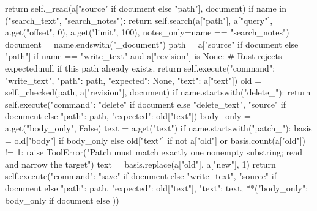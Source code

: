             return self._read(a["source" if document else "path"], document)
        if name in ("search_text", "search_notes"):
            return self.search(a["path"], a["query"], a.get("offset", 0), a.get("limit", 100), notes_only=name == "search_notes")
        document = name.endswith("_document")
        path = a["source" if document else "path"]
        if name == "write_text" and a["revision"] is None:
            # Rust rejects expected:null if this path already exists.
            return self.execute({"command": "write_text", "path": path, "expected": None, "text": a["text"]})
        old = self._checked(path, a["revision"], document)
        if name.startswith("delete_"):
            return self.execute({"command": "delete" if document else "delete_text",
                "source" if document else "path": path, "expected": old["text"]})
        body_only = a.get("body_only", False)
        text = a.get("text")
        if name.startswith("patch_"):
            basis = old["body"] if body_only else old["text"]
            if not a["old"] or basis.count(a["old"]) != 1:
                raise ToolError("Patch must match exactly one nonempty substring; read and narrow the target")
            text = basis.replace(a["old"], a["new"], 1)
        return self.execute({"command": "save" if document else "write_text",
            "source" if document else "path": path, "expected": old["text"], "text": text,
            **({"body_only": body_only} if document else {})})

